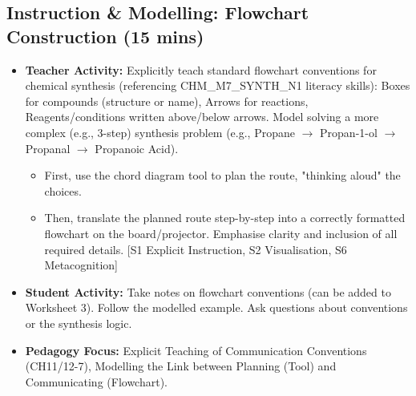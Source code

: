 \documentclass[11pt, a4paper]{article}
\begin{document}
\subsection*{Instruction \& Modelling: Flowchart Construction (15 mins)}
\begin{itemize}
    \item \textbf{Teacher Activity:} Explicitly teach standard flowchart conventions for chemical synthesis (referencing CHM\_M7\_SYNTH\_N1 literacy skills): Boxes for compounds (structure or name), Arrows for reactions, Reagents/conditions written above/below arrows. Model solving a more complex (e.g., 3-step) synthesis problem (e.g., Propane $\rightarrow$ Propan-1-ol $\rightarrow$ Propanal $\rightarrow$ Propanoic Acid).
        \begin{itemize}
            \item First, use the chord diagram tool to plan the route, "thinking aloud" the choices.
            \item Then, translate the planned route step-by-step into a correctly formatted flowchart on the board/projector. Emphasise clarity and inclusion of all required details. [S1 Explicit Instruction, S2 Visualisation, S6 Metacognition]
        \end{itemize}
    \item \textbf{Student Activity:} Take notes on flowchart conventions (can be added to Worksheet 3). Follow the modelled example. Ask questions about conventions or the synthesis logic.
    \item \textbf{Pedagogy Focus:} Explicit Teaching of Communication Conventions (CH11/12-7), Modelling the Link between Planning (Tool) and Communicating (Flowchart).
\end{itemize}
\end{document}
